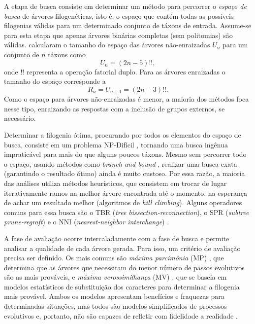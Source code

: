 \documentclass[12pt]{article}
\begin{document}
A etapa de busca consiste em determinar um método para percorrer o \emph{espaço de busca} de árvores filogenéticas, isto é, o espaço que contém todas as possíveis filogenias válidas para um determinado conjunto de táxons de entrada. Assume-se para esta etapa que apenas árvores binárias completas (sem politomias) são válidas. \cite{cavalli1967phylogenetic} calcularam o  tamanho do espaço das árvores não-enraizadas $U_n$ para um conjunto de $n$ táxons como
\begin{equation}
  U_n = (2n-5)!!,
\end{equation}
onde $!!$ representa a operação fatorial duplo. Para as árvores enraizadas o tamanho do espaço corresponde a 
\begin{equation}
  R_n = U_{n+1} = (2n-3)!!.
\end{equation}
Como o espaço para árvores não-enraizadas é menor, a maioria dos métodos foca nesse tipo, enraizando as respostas com a inclusão de grupos externos, se necessário.

Determinar a filogenia ótima, procurando por todos os elementos do espaço de busca, consiste em um problema NP-Difícil \cite{np-hardness}, tornando uma busca ingênua impraticável para mais do que alguns poucos táxons. Mesmo sem percorrer todo o espaço, usando métodos como \emph{branch and bound} \cite{branch-and-bound}, realizar uma busca exata (garantindo o resultado ótimo) ainda é muito custoso. Por essa razão, a maioria das análises utiliza métodos heurísticos, que consistem em trocar de lugar iterativamente ramos na melhor árvore encontrada até o momento, na esperança de achar um resultado melhor (algoritmos de \emph{hill climbing}). Alguns operadores comuns para essa busca são o TBR (\emph{tree bissection-reconnection}), o SPR (\emph{subtree prune-regraft}) e o NNI (\emph{nearest-neighbor interchange}) \cite{garli}.

A fase de avaliação ocorre intercaladamente com a fase de busca e permite analisar a qualidade de cada árvore gerada. Para isso, um critério de avaliação precisa ser definido. Os mais comuns são \emph{máxima parcimônia} (MP) \cite{maximum-parsimony}, que determina que as árvores que necessitam do menor número de passos evolutivos são as mais prováveis, e \emph{máxima verossimilhança} (MV) \cite{cavalli1967phylogenetic, maximum-likelihood}, que se baseia em modelos estatísticos de substituição dos caracteres para determinar a filogenia mais provável. Ambos os modelos apresentam benefícios e fraquezas para determinadas situações, mas todos são modelos simplificados de processos evolutivos e, portanto, não são capazes de refletir com fidelidade a realidade \cite{cavalli1967phylogenetic}.
\end{document}
